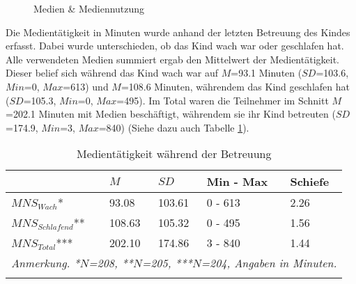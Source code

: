 \begin{figure}[htp]
\caption{Medien \& Mediennutzung}\label{fig:Mediennutzung}
\centering
{}
\end{figure}

Die Medientätigkeit in Minuten wurde anhand der letzten Betreuung des Kindes erfasst. Dabei wurde unterschieden, ob das Kind wach war oder geschlafen hat. Alle verwendeten Medien summiert ergab den Mittelwert der Medientätigkeit. Dieser belief sich während das Kind wach war auf $M$=93.1 Minuten ($SD$=103.6, $Min$=0, $Max$=613) und $M$=108.6 Minuten, währendem das Kind geschlafen hat ($SD$=105.3, $Min$=0, $Max$=495). Im Total waren die Teilnehmer im Schnitt $M$=202.1 Minuten mit Medien beschäftigt, währendem sie ihr Kind betreuten ($SD$=174.9, $Min$=3, $Max$=840) (Siehe dazu auch Tabelle \ref{table:Medientätigkeit}).

\begin{table}%
\begin{tabular}{m{8em} m{4em}  m{4em}  m{5em} m{4em}} 
  \hline
  & $M$ & $SD$ & Min - Max & Schiefe\\
  \hline
  $MNS_{Wach}$* & 93.08 & 103.61 & 0 - 613 & 2.26\\
  $MNS_{Schlafend}$** & 108.63 & 105.32 & 0 - 495 & 1.56\\
  $MNS_{Total}$*** & 202.10 & 174.86 & 3 - 840 & 1.44 \\
  \hline
  \multicolumn{5}{l}{\textit{Anmerkung. *$N$=208, **$N$=205, ***$N$=204, Angaben in Minuten.}}\\
  &&&&\\
\end{tabular}
\caption{Medientätigkeit während der Betreuung}
\label{table:Medientätigkeit}
\end{table}

